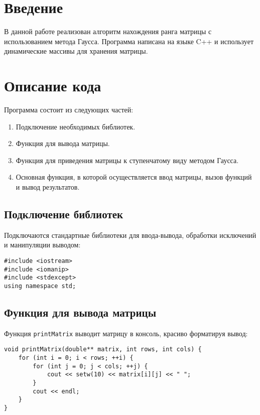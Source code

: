 \documentclass[12pt,a4paper]{scrartcl}
\begin{document}
\section*{Введение}
В данной работе реализован алгоритм нахождения ранга матрицы с использованием метода Гаусса. Программа написана на языке C++ и использует динамические массивы для хранения матрицы.

\section*{Описание кода}
Программа состоит из следующих частей:
\begin{enumerate}
    \item Подключение необходимых библиотек.
    \item Функция для вывода матрицы.
    \item Функция для приведения матрицы к ступенчатому виду методом Гаусса.
    \item Основная функция, в которой осуществляется ввод матрицы, вызов функций и вывод результатов.
\end{enumerate}

\subsection*{Подключение библиотек}
Подключаются стандартные библиотеки для ввода-вывода, обработки исключений и манипуляции выводом:
\begin{verbatim}
#include <iostream>
#include <iomanip>
#include <stdexcept>
using namespace std;
\end{verbatim}

\subsection*{Функция для вывода матрицы}
Функция \texttt{printMatrix} выводит матрицу в консоль, красиво форматируя вывод:
\begin{verbatim}
void printMatrix(double** matrix, int rows, int cols) {
    for (int i = 0; i < rows; ++i) {
        for (int j = 0; j < cols; ++j) {
            cout << setw(10) << matrix[i][j] << " ";
        }
        cout << endl;
    }
}
\end{verbatim}
\end{document}
